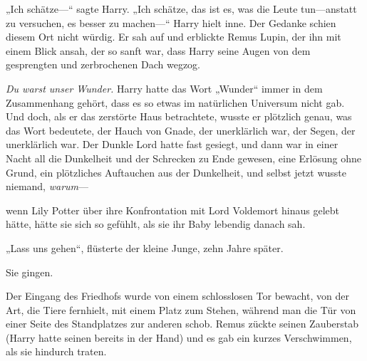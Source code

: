„Ich schätze—“ sagte Harry. „Ich schätze, das ist es, was die Leute tun—anstatt zu versuchen, es besser zu machen—“ Harry hielt inne. Der Gedanke schien diesem Ort nicht würdig. Er sah auf und erblickte Remus Lupin, der ihn mit einem Blick ansah, der so sanft war, dass Harry seine Augen von dem gesprengten und zerbrochenen Dach wegzog.

\emph{Du warst unser Wunder.} Harry hatte das Wort „Wunder“ immer in dem Zusammenhang gehört, dass es so etwas im natürlichen Universum nicht gab. Und doch, als er das zerstörte Haus betrachtete, wusste er plötzlich genau, was das Wort bedeutete, der Hauch von Gnade, der unerklärlich war, der Segen, der unerklärlich war. Der Dunkle Lord hatte fast gesiegt, und dann war in einer Nacht all die Dunkelheit und der Schrecken zu Ende gewesen, eine Erlösung ohne Grund, ein plötzliches Auftauchen aus der Dunkelheit, und selbst jetzt wusste niemand, \emph{warum}—

wenn Lily Potter über ihre Konfrontation mit Lord Voldemort hinaus gelebt hätte, hätte sie sich so gefühlt, als sie ihr Baby lebendig danach sah.

„Lass uns gehen“, flüsterte der kleine Junge, zehn Jahre später.

Sie gingen.

Der Eingang des Friedhofs wurde von einem schlosslosen Tor bewacht, von der Art, die Tiere fernhielt, mit einem Platz zum Stehen, während man die Tür von einer Seite des Standplatzes zur anderen schob. Remus zückte seinen Zauberstab (Harry hatte seinen bereits in der Hand) und es gab ein kurzes Verschwimmen, als sie hindurch traten.

